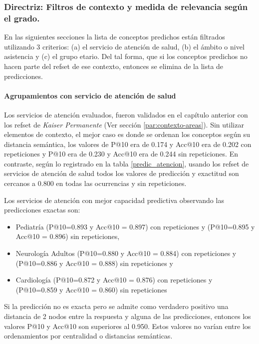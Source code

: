 \subsubsection{Directriz: Filtros de contexto y medida de relevancia según el grado.}

En las siguientes secciones  la lista de conceptos predichos están filtrados utilizando 3 criterios: (a) el servicio de atención de salud, (b) el ámbito o nivel asistencia y (c) el grupo etario. Del tal forma, que si los conceptos predichos no hacen parte del {\acrshort{refset}} de ese contexto, entonces se elimina de la lista de predicciones.

\paragraph{Agrupamientos con servicio de atención de salud}

Los servicios de atención evaluados, fueron validados en el capítulo anterior con los {\acrshort{refset}} de \textit{Kaiser Permanente} (Ver sección \ref{par:contexto-areas}). Sin utilizar elementos de contexto, el mejor caso es donde se ordenan los conceptos según su distancia semántica, los valores de P@10 era de \num{0.174} y Acc@10 era de \num{0.202} con repeticiones y P@10 era de \num{0.230} y Acc@10 era de \num{0.244} sin repeticiones. En contraste, según lo registrado en la tabla \ref{predic_atencion}, usando los {\acrshort{refset}} de servicios de atención de salud todos los valores de predicción y exactitud son cercanos a \num{0.800} en todas las ocurrencias y sin repeticiones.

Los servicios de atención con mejor capacidad predictiva observando las predicciones exactas son:

\begin{itemize}
\item Pediatría (P@10=\num{0.893} y Acc@10 = \num{0.897}) con repeticiones y (P@10=\num{0.895} y Acc@10 = \num{0.896}) sin repeticiones,
\item Neurología Adultos (P@10=\num{0.880} y Acc@10 = \num{0.884}) con repeticiones y (P@10=\num{0.886} y Acc@10 = \num{0.888}) sin repeticiones y 
\item Cardiología (P@10=\num{0.872} y Acc@10 = \num{0.876}) con repeticiones y (P@10=\num{0.859} y Acc@10 = \num{0.860}) sin repeticiones
\end{itemize}

Si la predicción no es exacta pero se admite como verdadero positivo una distancia de 2 nodos entre la respuesta y alguna de las predicciones, entonces los valores P@10 y Acc@10 son superiores al \num{0.950}. Estos valores no varían entre los ordenamientos por centralidad o distancias semánticas.


